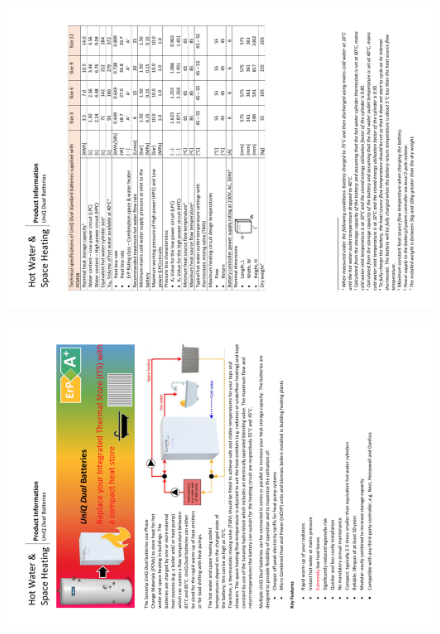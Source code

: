 \newpage
\begin{figure}
	\centering
	\includegraphics[height=0.48\textheight]{Appendices/5_PIS_Dual_02.png}
\end{figure}

\begin{figure}
	\centering
	\includegraphics[height=0.48\textheight]{Appendices/5_PIS_Dual_01.png}
\end{figure}


